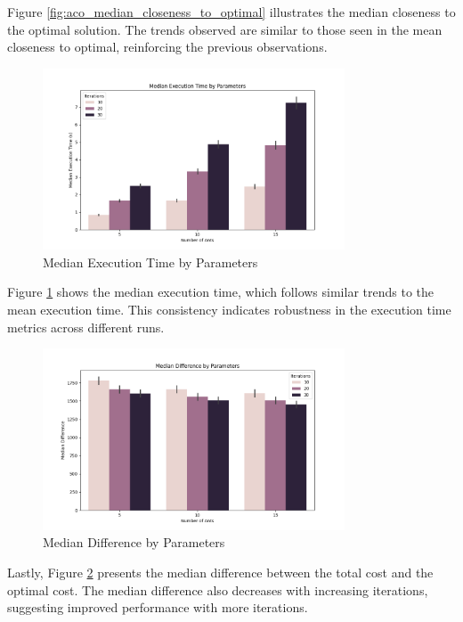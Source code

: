 \documentclass[
]{article}
\begin{document}
    Figure \ref{fig:aco_median_closeness_to_optimal} illustrates the median closeness to the optimal solution. The trends observed are similar to those seen in the mean closeness to optimal, reinforcing the previous observations.

    \begin{figure}[H]
        \centering
        \includegraphics[width=0.8\textwidth]{./aco/aco_median_execution_time.png}
        \caption{Median Execution Time by Parameters}
        \label{fig:aco_median_execution_time}
    \end{figure}

    Figure \ref{fig:aco_median_execution_time} shows the median execution time, which follows similar trends to the mean execution time. This consistency indicates robustness in the execution time metrics across different runs.

    \begin{figure}[H]
        \centering
        \includegraphics[width=0.8\textwidth]{./aco/aco_median_difference.png}
        \caption{Median Difference by Parameters}
        \label{fig:aco_median_difference}
    \end{figure}

    Lastly, Figure \ref{fig:aco_median_difference} presents the median difference between the total cost and the optimal cost. The median difference also decreases with increasing iterations, suggesting improved performance with more iterations.
\end{document}
